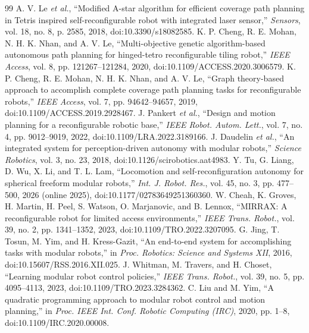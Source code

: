 \documentclass[conference]{IEEEtran}
\begin{document}
\begin{thebibliography}{99}
 A. V. Le \emph{et al.}, ``Modified A-star algorithm for efficient coverage path planning in Tetris inspired self-reconfigurable robot with integrated laser sensor,'' \emph{Sensors}, vol. 18, no. 8, p. 2585, 2018, doi:10.3390/s18082585.
 K. P. Cheng, R. E. Mohan, N. H. K. Nhan, and A. V. Le, ``Multi-objective genetic algorithm-based autonomous path planning for hinged-tetro reconfigurable tiling robot,'' \emph{IEEE Access}, vol. 8, pp. 121267--121284, 2020, doi:10.1109/ACCESS.2020.3006579.
 K. P. Cheng, R. E. Mohan, N. H. K. Nhan, and A. V. Le, ``Graph theory-based approach to accomplish complete coverage path planning tasks for reconfigurable robots,'' \emph{IEEE Access}, vol. 7, pp. 94642--94657, 2019, doi:10.1109/ACCESS.2019.2928467.
 J. Pankert \emph{et al.}, ``Design and motion planning for a reconfigurable robotic base,'' \emph{IEEE Robot. Autom. Lett.}, vol. 7, no. 4, pp. 9012--9019, 2022, doi:10.1109/LRA.2022.3189166.
 J. Daudelin \emph{et al.}, ``An integrated system for perception-driven autonomy with modular robots,'' \emph{Science Robotics}, vol. 3, no. 23, 2018, doi:10.1126/scirobotics.aat4983.
 Y. Tu, G. Liang, D. Wu, X. Li, and T. L. Lam, ``Locomotion and self-reconfiguration autonomy for spherical freeform modular robots,'' \emph{Int. J. Robot. Res.}, vol. 45, no. 3, pp. 477--500, 2026 (online 2025), doi:10.1177/02783649251360360.
 W. Cheah, K. Groves, H. Martin, H. Peel, S. Watson, O. Marjanovic, and B. Lennox, ``MIRRAX: A reconfigurable robot for limited access environments,'' \emph{IEEE Trans. Robot.}, vol. 39, no. 2, pp. 1341--1352, 2023, doi:10.1109/TRO.2022.3207095.
 G. Jing, T. Tosun, M. Yim, and H. Kress-Gazit, ``An end-to-end system for accomplishing tasks with modular robots,'' in \emph{Proc. Robotics: Science and Systems XII}, 2016, doi:10.15607/RSS.2016.XII.025.
 J. Whitman, M. Travers, and H. Choset, ``Learning modular robot control policies,'' \emph{IEEE Trans. Robot.}, vol. 39, no. 5, pp. 4095--4113, 2023, doi:10.1109/TRO.2023.3284362.
 C. Liu and M. Yim, ``A quadratic programming approach to modular robot control and motion planning,'' in \emph{Proc. IEEE Int. Conf. Robotic Computing (IRC)}, 2020, pp. 1--8, doi:10.1109/IRC.2020.00008.

\end{thebibliography}
\end{document}
